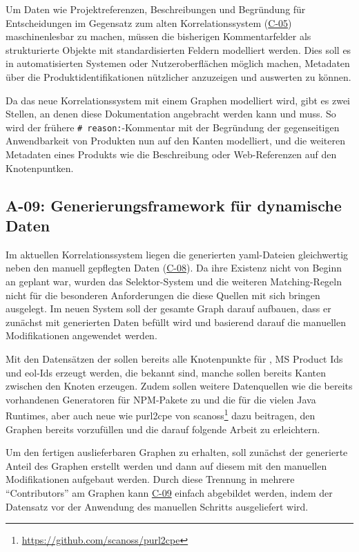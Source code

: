 Um Daten wie Projektreferenzen, Beschreibungen und Begründung für Entscheidungen im Gegensatz zum alten Korrelationssystem (\hyperref[subsec:c-05-reason-not-good-enough]{C-05}) maschinenlesbar zu machen, müssen die bisherigen Kommentarfelder als strukturierte Objekte mit standardisierten Feldern modelliert werden.
Dies soll es in automatisierten Systemen oder Nutzeroberflächen möglich machen, Metadaten über die Produktidentifikationen nützlicher anzuzeigen und auswerten zu können.

Da das neue Korrelationssystem mit einem Graphen modelliert wird, gibt es zwei Stellen, an denen diese Dokumentation angebracht werden kann und muss.
So wird der frühere \texttt{\# reason:}-Kommentar mit der Begründung der gegenseitigen Anwendbarkeit von Produkten nun auf den Kanten modelliert, und die weiteren Metadaten eines Produkts wie die Beschreibung oder Web-Referenzen auf den Knotenpuntken.

\subsection{A-09: Generierungsframework für dynamische Daten}\label{subsec:req-generated-data}

Im aktuellen Korrelationssystem liegen die generierten \acrshort{yaml}-Dateien gleichwertig neben den manuell gepflegten Daten (\hyperref[subsec:c-08-generated-correlation-data]{C-08}).
Da ihre Existenz nicht von Beginn an geplant war, wurden das Selektor-System und die weiteren Matching-Regeln nicht für die besonderen Anforderungen die diese Quellen mit sich bringen ausgelegt.
Im neuen System soll der gesamte Graph darauf aufbauen, dass er zunächst mit generierten Daten befüllt wird und basierend darauf die manuellen Modifikationen angewendet werden.

Mit den Datensätzen der \metaeffektsp sollen bereits alle Knotenpunkte für , MS Product Ids und \acrshort{eol}-Ids erzeugt werden, die bekannt sind, manche sollen bereits Kanten zwischen den Knoten erzeugen.
Zudem sollen weitere Datenquellen wie die bereits vorhandenen Generatoren für NPM-Pakete zu  und die für die vielen Java Runtimes, aber auch neue wie purl2cpe von scanoss\footnote{\url{https://github.com/scanoss/purl2cpe}} dazu beitragen, den Graphen bereits vorzufüllen und die darauf folgende Arbeit zu erleichtern.

Um den fertigen auslieferbaren Graphen zu erhalten, soll zunächst der generierte Anteil des Graphen erstellt werden und dann auf diesem mit den manuellen Modifikationen aufgebaut werden.
Durch diese Trennung in mehrere \enquote{Contributors} am Graphen kann \hyperref[subsec:c-09-sharing-of-public-data]{C-09} einfach abgebildet werden, indem der Datensatz vor der Anwendung des manuellen Schritts ausgeliefert wird.

